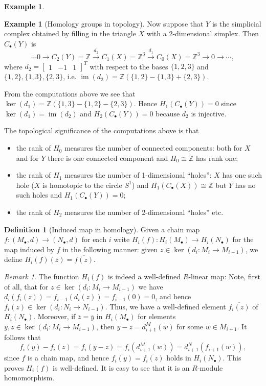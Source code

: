 \documentclass{amsart}[12pt]
\def\image{\operatorname{im}}
\def\im{\image}
\def\ker{\operatorname{ker}}
\newcommand{\Z}{\mathbb{Z}}
\numberwithin{equation}{section}
\theoremstyle{plain} %
\theoremstyle{definition}
\newtheorem{defn}[equation]{Definition}
\newtheorem{ex}[equation]{Example}
\theoremstyle{remark}
\newtheorem{rem}[equation]{Remark}
\newcommand{\xra}[1]{\xrightarrow{#1}}
\begin{document}
\begin{ex}
\begin{ex}[Homology groups in topology]
Now suppose that $Y$ is the simplicial complex obtained by filling in the triangle $X$ with a 2-dimensional simplex.
Then $C_\bullet(Y)$ is
$$
\cdots 0 \to C_2(Y)=\Z \xra{d_2} C_1(X)=\Z^3 \xra{d_1} C_0(X)=\Z^3 \to 0 \to \cdots,
$$
where $d_2=\begin{bmatrix} 1 & -1 & 1\end{bmatrix}^T$ with respect to the bases $\{1,2,3\}$ and $\{1,2\}, \{1,3\}, \{2,3\}$, i.e. $\im(d_2)=\Z(\{1,2\}-\{1,3\}+\{2,3\})$.

From the computations above we see that $\ker(d_1)=\Z( \{1,3\}-\{1,2\}-\{2,3\})$. Hence $H_1(C_\bullet(Y))=0$ since $\ker(d_1)=\im(d_2)$ and $H_2(C_\bullet(Y))=0$ because $d_2$ is injective.

The topological significance of the computations above is that
\begin{itemize}
\item  the rank of $H_0$ measures the number of connected components: both for $X$ and for $Y$ there is one connected component and $H_0\cong \Z$ has rank one;
\item  the rank of $H_1$ measures the number of 1-dimensional ``holes'': $X$ has one such hole ($X$ is homotopic to the circle $S^1$) and $H_1(C_\bullet(X))\cong \Z$ but $Y$ has no such holes and $H_1(C_\bullet(Y))=0$;
\item the rank of $H_2$ measures the number of 2-dimensional ``holes'' etc.
\end{itemize}
\end{ex}



\begin{defn}[Induced map in homology] 
\label{def:inducedmap}
    Given a chain map $f: (M_\bullet,d) \to (N_\bullet, d)$ for each $i$ write $H_i(f): H_i(M_\bullet) \to H_i(N_\bullet)$
    for the map induced by $f$ in the following manner: given $z \in \ker(d_i: M_i \to M_{i-1})$,
    we define   $H_i(f)(\overline{z}) = \overline{f(z)}$. 
\end{defn}
 
\begin{rem}
The function $H_i(f)$ is indeed a well-defined $R$-linear map: 
Note, first of all, that for 
$z \in \ker(d_i: M_i \to M_{i-1})$ we have $d_i(f_i(z)) = f_{i-1}(d_i(z))  = f_{i-1}(0) = 0$, and hence $f_i(z) \in \ker(d_i: N_i \to N_{i-1})$.
Thus, we have a well-defined element $\overline{f_i(z)}$ of $H_i(N_\bullet)$. Moreover,  
if $\overline{z} = \overline{y}$ in $H_i(M_\bullet)$ for elements
$y,z \in \ker(d_i: M_i \to M_{i-1})$, then $y-z = d^M_{i+1}(w)$ for some $w \in M_{i+1}$. It follows that
$$
f_i(y) - f_i(z) = f_i(y-z) = f_i(d^M_{i+1}(w)) = d^N_{i+1}(f_{i+1}(w)), 
$$
since $f$ is a chain map,  and hence $\overline{f_i(y)} = \overline{f_i(z)}$ holds in $H_i(N_\bullet)$. 
This proves $H_i(f)$ is well-defined. It is easy to see that it is an $R$-module homomorphism.
\end{rem}


\end{ex}
\end{document}
